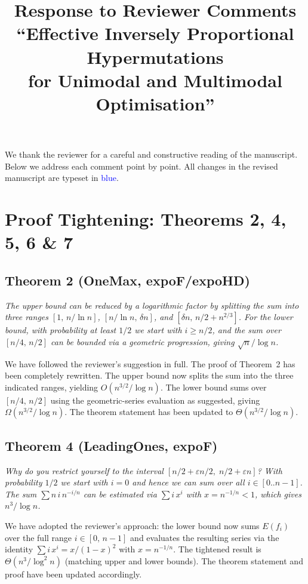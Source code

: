 \documentclass[11pt]{article}
\title{Response to Reviewer Comments\\[4pt]
\large ``Effective Inversely Proportional Hypermutations\\for Unimodal and Multimodal Optimisation''}
\author{}
\date{}
\newcommand{\RC}[1]{\textcolor{revcolor}{\textit{#1}}}
\newcommand{\resp}[1]{\smallskip\noindent #1\medskip}
\begin{document}
\maketitle

We thank the reviewer for a careful and constructive reading of the manuscript.
Below we address each comment point by point. All changes in the revised
manuscript are typeset in {\textcolor{blue}{blue}}.

\section*{Proof Tightening: Theorems 2, 4, 5, 6 \& 7}

\subsection*{Theorem 2 (OneMax, expoF/expoHD)}

\RC{The upper bound can be reduced by a logarithmic factor by splitting the sum
into three ranges $[1,\, n/\!\ln n]$, $[n/\!\ln n,\, \delta n]$, and
$[\delta n,\, n/2 + n^{2/3}]$. For the lower bound, with probability at least
$1/2$ we start with $i \ge n/2$, and the sum over $[n/4,\, n/2]$ can be bounded
via a geometric progression, giving $\sqrt{n}/\!\log n$.}

\resp{We have followed the reviewer's suggestion in full.
The proof of Theorem~2 has been completely rewritten.
The upper bound now splits the sum into the three indicated ranges, yielding
$O(n^{3/2}/\!\log n)$. The lower bound sums over $[n/4,\, n/2]$ using the
geometric-series evaluation as suggested, giving $\Omega(n^{3/2}/\!\log n)$.
The theorem statement has been updated to $\Theta(n^{3/2}/\!\log n)$.}

\subsection*{Theorem 4 (LeadingOnes, expoF)}

\RC{Why do you restrict yourself to the interval $[n/2+\varepsilon n/2,\;
n/2+\varepsilon n]$? With probability $1/2$ we start with $i=0$ and hence we
can sum over all $i\in[0..n-1]$. The sum $\sum n\,i\,n^{-i/n}$ can be estimated
via $\sum i\,x^i$ with $x=n^{-1/n}<1$, which gives $n^3/\!\log n$.}

\resp{We have adopted the reviewer's approach: the lower bound now sums
$E(f_i)$ over the full range $i\in[0,\,n-1]$ and evaluates the resulting series
via the identity $\sum i\,x^i = x/(1-x)^2$ with $x = n^{-1/n}$.
The tightened result is $\Theta(n^3/\!\log^2 n)$ (matching upper and lower
bounds). The theorem statement and proof have been updated accordingly.}
\end{document}

